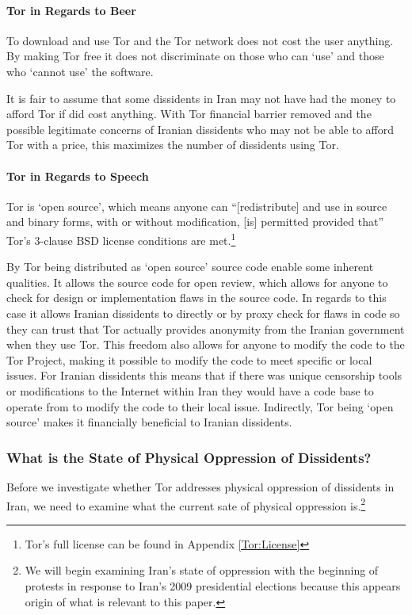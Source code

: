 \documentclass[11pt]{article}
\begin{document}
\begin{multicols}{2}
\paragraph{Tor in Regards to Beer}

To download and use Tor and the Tor network does not cost the user anything. By
making Tor free it does not discriminate on those who can `use' and those who
`cannot use' the software. 

It is fair to assume that some dissidents in Iran may not have had the money to
afford Tor if did cost anything. With Tor financial barrier removed and the
possible legitimate concerns of Iranian dissidents who may not be able to afford
Tor with a price, this maximizes the number of dissidents using Tor.

\paragraph{Tor in Regards to Speech}

Tor is `open source', which means anyone can ``[redistribute] and use in source
and binary forms, with or without modification, [is] permitted provided that''
Tor's 3-clause BSD license conditions are met.\footnote{Tor's full license can
be found in Appendix \ref{Tor:License}} \cite{BSD:3-ClauseLicense,
TOR:Download, TOR:BSD-License} 

By Tor being distributed as `open source' source code enable some inherent
qualities. It allows the source code for open review, which allows for anyone to
check for design or implementation flaws in the source code. In regards to this
case it allows Iranian dissidents to directly or by proxy check for flaws in
code so they can trust that Tor actually provides anonymity from the Iranian
government when they use Tor. This freedom also allows for anyone to modify the
code to the Tor Project, making it possible to modify the code to meet specific
or local issues. For Iranian dissidents this means that if there was unique
censorship tools or modifications to the Internet within Iran they would have a
code base to operate from to modify the code to their local issue.  Indirectly,
Tor being `open source' makes it financially beneficial to Iranian dissidents.

\subsubsection{What is the State of Physical Oppression of Dissidents?}
Before we investigate whether Tor addresses physical oppression of dissidents in
Iran, we need to examine what the current sate of physical oppression
is.\footnote{We will begin examining Iran's state of oppression with the beginning
of protests in response to Iran's 2009 presidential elections because this
appears origin of what is relevant to this paper.}


\end{multicols}
\end{document}
